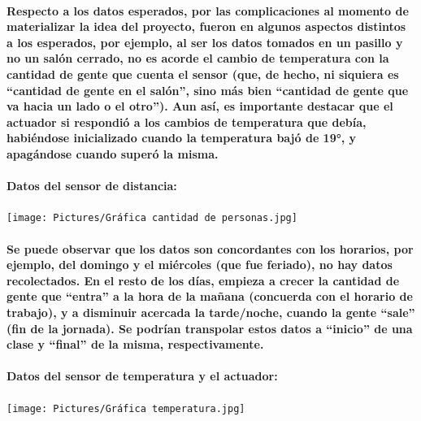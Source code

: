 \documentclass[12pt]{article} %
\newcommand{\normalparagraph}[1]{\paragraph{\textnormal{#1}}}
\begin{document}
\normalparagraph{Respecto a los datos esperados, por las complicaciones al momento de materializar la idea del proyecto, fueron en algunos aspectos distintos a los esperados, por ejemplo, al ser los datos tomados en un pasillo y no un salón cerrado, no es acorde el cambio de temperatura con la cantidad de gente que cuenta el sensor (que, de hecho, ni siquiera es “cantidad de gente en el salón”, sino más bien “cantidad de gente que va hacia un lado o el otro”). Aun así, es importante destacar que el actuador si respondió a los cambios de temperatura que debía, habiéndose inicializado cuando la temperatura bajó de 19°, y apagándose cuando superó la misma. }

\normalparagraph{Datos del sensor de distancia:}

\begin{center}
\begin{minipage}[c]{0.75\textwidth} %
  \centering
  \texttt{[image: Pictures/Gráfica cantidad de personas.jpg]}
  \label{fig:grafica-personas}
\end{minipage}
\end{center}


\normalparagraph{Se puede observar que los datos son concordantes con los horarios, por ejemplo, del domingo y el miércoles (que fue feriado), no hay datos recolectados. En el resto de los días, empieza a crecer la cantidad de gente que “entra” a la hora de la mañana (concuerda con el horario de trabajo), y a disminuir acercada la tarde/noche, cuando la gente “sale” (fin de la jornada).
Se podrían transpolar estos datos a “inicio” de una clase y “final” de la misma, respectivamente.}

\normalparagraph{Datos del sensor de temperatura y el actuador:}


\begin{center}
\begin{minipage}[c]{0.65\textwidth} %
  \centering
  \texttt{[image: Pictures/Gráfica temperatura.jpg]}
  \label{fig:grafica-temperatura}
\end{minipage}
\end{center}


\end{document}
